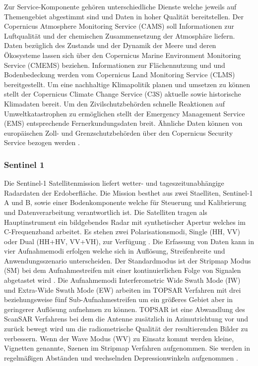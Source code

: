 Zur Service-Komponente gehören unterschiedliche Dienste welche jeweils auf Themengebiet abgestimmt sind und Daten in hoher Qualität bereitstellen.
Der Copernicus Atmosphere Monitoring Service (CAMS) soll Informationen zur Luftqualität und der chemischen Zusammensetzung der Atmosphäre liefern. 
Daten bezüglich des Zustands und der Dynamik der Meere und deren Ökosysteme lassen sich über den Copernicus Marine Environment Monitoring Service (CMEMS) beziehen. 
Informationen zur Flächennutzung und und Bodenbedeckung werden vom Copernicus Land Monitoring Service (CLMS) bereitgestellt. 
Um eine nachhaltige Klimapolitik planen und umsetzen zu können stellt der Copernicus Climate Change Service (C3S) aktuelle sowie historische Klimadaten bereit.  
Um den Zivilschutzbehörden schnelle Reaktionen auf Umweltkatastrophen zu ermöglichen stellt der  Emergency Management Service (EMS) entsprechende Fernerkundungsdaten 
breit. Ähnliche Daten können von europäischen Zoll- und Grenzschutzbehörden über den Copernicus Security Service bezogen werden
\cite{copernicus_regulation}\cite{what_is_copernicus}.

\subsubsection{Sentinel 1}
Die Sentinel-1 Satellitenmission liefert wetter- und tageszeitunabhängige Radardaten der Erdoberfläche. Die Mission besthet aus zwei Staelliten, Sentinel-1 A und B,
sowie einer Bodenkomponente welche für Steuerung und Kalibrierung und Datenverarbeitung verantwortlich ist. Die Satelliten tragen als Hauptinstrument ein 
bildgebendes Radar mit synthetischer Apertur welches im C-Frequenzband arbeitet. Es stehen zwei Polarisationsmodi, Single (HH, VV) oder Dual (HH+HV, VV+VH),
zur Verfügung \cite{sentinel_1_definition}. 
Die Erfassung von Daten kann in vier Aufnahmemodi erfolgen welche sich in Auflösung, Streifenbreite und Anwendungsszenario unterscheiden. 
Der Standardmodus ist der Stripmap Modus (SM) bei dem Aufnahmestreifen mit einer kontinuierlichen Folge von Signalen abgetastet wird \cite{sentinel_1_definition}.
Die Aufnahmemodi Interferometric Wide Swath Mode (IW) und Extra-Wide Swath Mode (EW) arbeiten im TOPSAR Verfahren mit drei beziehungsweise
fünf Sub-Aufnahmestreifen um ein größeres Gebiet aber in geringerer Auflösung aufnehmen zu können. TOPSAR ist eine Abwandlung des ScanSAR Verfahrens bei 
dem die Antenne zusätzlich in Azimutrichtung vor und zurück bewegt wird um die radiometrische Qualität der resultierenden Bilder zu verbessern. 
Wenn der Wave Modus (WV) zu Einsatz kommt werden kleine, Vignetten genannte, Szenen im Stripmap Verfahren aufgenommen. Sie werden in regelmäßigen Abständen und
wechselnden Depressionwinkeln aufgenommen \cite{tutorial_on_sar}\cite{sentinel_1_definition}.   


